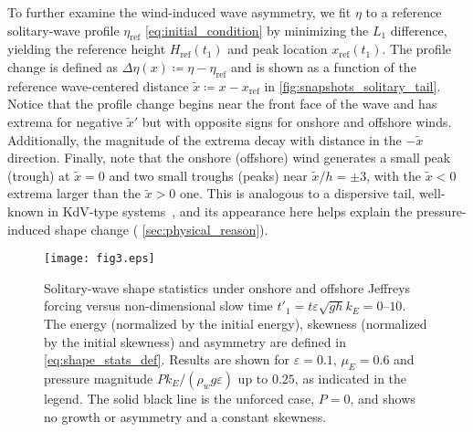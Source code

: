 \documentclass{jfm}
\renewcommand*{\epsilon}{\varepsilon}
\begin{document}
To further examine the wind-induced wave asymmetry, we fit $\eta$ to a
reference solitary-wave profile $\eta_{\text{ref}}$
\cref{eq:initial_condition} by minimizing the $L_1$ difference, yielding
the reference height $H_{\text{ref}}(t_1)$ and peak location
$x_{\text{ref}}(t_1)$.
The profile change is defined as $\Delta \eta(x) \coloneqq \eta -
\eta_{\text{ref}}$ and is shown as a function of the reference
wave-centered distance $\tilde{x} \coloneqq x - x_{\text{ref}}$ in
\cref{fig:snapshots_solitary_tail}.
Notice that the profile change begins near the front face of the wave
and has extrema for negative $\tilde{x}'$ but with opposite signs for
onshore and offshore winds.
Additionally, the magnitude of the extrema decay with distance in the
$-\tilde{x}$ direction.
Finally, note that the onshore (offshore) wind generates a small peak
(trough) at $\tilde{x} = 0$ and two small troughs (peaks) near
$\tilde{x}/h = \pm 3$, with the $\tilde{x}<0$ extrema larger than the
$\tilde{x}>0$ one.
This is analogous to a dispersive tail, well-known in KdV-type
systems~\citep[\eg][]{hammack1974korteweg}, and its appearance here
helps explain the pressure-induced shape change (\cf{}
\cref{sec:physical_reason}).

\begin{figure}
  \centering
  { %
    \label{fig:statistics_solitary:a}
    \label{fig:statistics_solitary:b}
    \label{fig:statistics_solitary:c}
  }
  \texttt{[image: fig3.eps]}
  \caption{
    Solitary-wave shape statistics under onshore and offshore
    Jeffreys forcing versus non-dimensional slow time $t'_1 = t
    \epsilon \sqrt{gh} k_E = \numrange{0}{10}$.
    The
    energy (normalized by the initial energy),
    skewness (normalized by the initial skewness) and
    asymmetry are defined in
    \cref{eq:shape_stats_def}.
    Results are shown for $\epsilon=0.1$, $\mu_E = 0.6$ and pressure
    magnitude $P k_E/(\rho_w g \epsilon)$ up to $0.25$, as indicated in
    the legend.
    The solid black line is the unforced case, $P = 0$, and
    shows no growth or asymmetry and a constant skewness.
  }\label{fig:statistics_solitary}
\end{figure}
\end{document}
